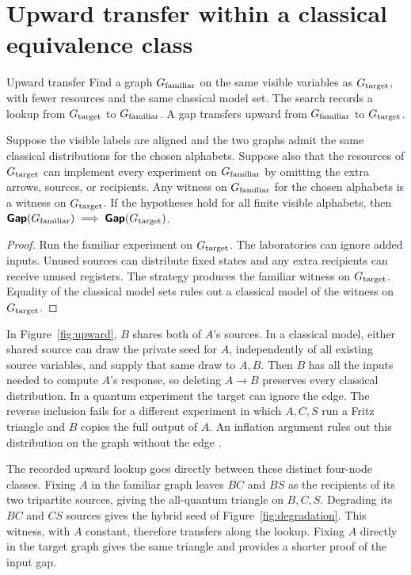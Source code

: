 \section{Upward transfer within a classical equivalence class}\label{app:upward}
\begin{piggyback}{Upward transfer}
Find a graph \(G_{\text{familiar}}\) on the same visible variables as
\(G_{\text{target}}\), with fewer resources and the same classical model set.
The search records a lookup from \(G_{\text{target}}\) to \(G_{\text{familiar}}\).
A gap transfers upward from \(G_{\text{familiar}}\) to \(G_{\text{target}}\).
\end{piggyback}
\begin{proposition}\label{prop:upward}
Suppose the visible labels are aligned and the two graphs admit the
same classical distributions for the chosen alphabets. Suppose also
that the resources of \(G_{\text{target}}\) can implement every experiment on
\(G_{\text{familiar}}\) by omitting the extra arrows, sources, or recipients.
Any witness on \(G_{\text{familiar}}\) for the chosen alphabets is a witness on
\(G_{\text{target}}\). If the hypotheses hold for all finite visible alphabets,
then \(\operatorname{\text{\normalfont\sffamily\bfseries Gap}}(G_{\text{familiar}})\implies\operatorname{\text{\normalfont\sffamily\bfseries Gap}}(G_{\text{target}})\).
\end{proposition}
\begin{proof}
Run the familiar experiment on \(G_{\text{target}}\). The laboratories can ignore
added inputs. Unused sources can distribute fixed states and any extra
recipients can receive unused registers. The strategy produces the familiar
witness on \(G_{\text{target}}\). Equality of the classical model sets rules out
a classical model of the witness on \(G_{\text{target}}\).
\end{proof}

In Figure~\ref{fig:upward}, \(B\) shares both of \(A\)'s sources.
In a classical model, either shared source can draw the private seed for
\(A\), independently of all existing source variables, and supply that
same draw to \(A,B\). Then \(B\) has all the inputs needed to compute
\(A\)'s response, so deleting \(A\to B\) preserves every classical
distribution. In a quantum experiment the target can ignore the edge.
The reverse inclusion fails for a different experiment in which \(A,C,S\)
run a Fritz triangle and \(B\) copies the full output of \(A\). An
inflation argument rules out this distribution on the graph without
the edge \cite{ObsClassification}.

The recorded upward lookup goes directly between these distinct
four-node classes. Fixing \(A\) in the familiar graph leaves \(BC\) and
\(BS\) as the recipients of its two tripartite sources, giving the all-quantum triangle
on \(B,C,S\). Degrading its \(BC\) and \(CS\) sources gives the hybrid
seed of Figure~\ref{fig:degradation}. This witness, with \(A\) constant,
therefore transfers along the lookup. Fixing \(A\) directly in the target graph gives the same
triangle and provides a shorter proof of the input gap.

